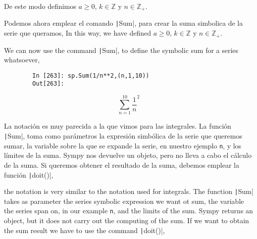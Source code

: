 \begin{paracol}{2}
De este modo definimos $a \ge 0$, $k \in \mathbb{Z}$ y $n \in \mathbb{Z}_+$.

Podemos ahora emplear el comando \texttt|Sum|, para crear la suma simbolica de la serie que queramos,
\switchcolumn
In this way, we have defined $a \ge 0$, $k \in \mathbb{Z}$ y $n \in \mathbb{Z}_+$.

We can now use the command \texttt|Sum|, to define the symbolic sum for a series whatsoever,
\end{paracol}
\begin{center}
	\begin{minipage}{.7\textwidth}
		\begin{verbatim}
		In [263]: sp.Sum(1/n**2,(n,1,10))
		Out[263]:	
		\end{verbatim}
		\begin{equation*}
			\sum_{n=1}^{10}\frac{1}{n}^2
		\end{equation*}
	\end{minipage}
\end{center}
\begin{paracol}{2}
La notación es muy parecida a la que vimos para las integrales. La función \texttt|Sum|, toma como parámetros la expresión simbólica de la serie que queremos sumar, la variable sobre la que se expande la serie, en nuestro ejemplo \texttt{n}, y los límites de la suma. Sympy nos devuelve un objeto, pero no lleva a cabo el cálculo de la suma. Si queremos obtener el resultado de la suma, debemos emplear la función \texttt|doit()|,

\switchcolumn
the notation is very similar to the notation used for integrals. The function \texttt|Sum| takes as parameter the series symbolic expression we want ot sum, the variable the series span on, in our example \texttt{n}, and the limits of the sum. Sympy returns an object, but it does not carry out the computing of the sum. If we want to obtain the sum result we have to use the command \texttt|doit()|,
\end{paracol}

